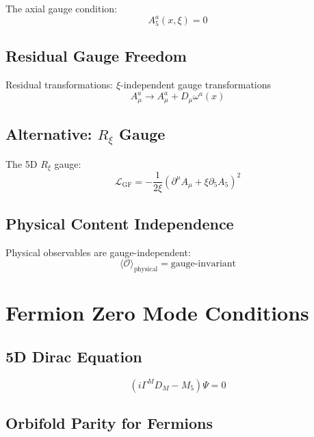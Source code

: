 \documentclass[11pt,a4paper]{article}
\begin{document}
The axial gauge condition:
\begin{equation}
  A_5^a(x,\xi) = 0
  \label{eq:app-a5-gauge}
\end{equation}

\subsection{Residual Gauge Freedom}

Residual transformations: $\xi$-independent gauge transformations
\begin{equation}
  A_\mu^a \to A_\mu^a + D_\mu \omega^a(x)
  \label{eq:app-residual-gauge}
\end{equation}

\subsection{Alternative: $R_\xi$ Gauge}

The 5D $R_\xi$ gauge:
\begin{equation}
  \mathcal{L}_{\text{GF}} = -\frac{1}{2\xi}(\partial^\mu A_\mu + \xi \partial_5 A_5)^2
  \label{eq:app-rxi-gauge}
\end{equation}

\subsection{Physical Content Independence}

Physical observables are gauge-independent:
\begin{equation}
  \langle \mathcal{O} \rangle_{\text{physical}} = \text{gauge-invariant}
  \label{eq:app-gauge-independence}
\end{equation}

\section{Fermion Zero Mode Conditions}
\label{app:fermion-zero}

\subsection{5D Dirac Equation}

\begin{equation}
  (i\Gamma^M D_M - M_5) \Psi = 0
  \label{eq:app-5d-dirac}
\end{equation}

\subsection{Orbifold Parity for Fermions}
\end{document}
